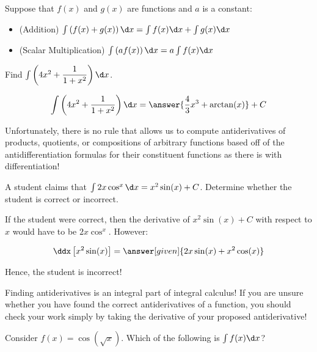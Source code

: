 \documentclass[nooutcomes]{ximera}
\begin{document}
\begin{theorem} 
Suppose that $f(x)$ and $g(x)$ are functions and $a$ is a constant:
\begin{itemize}
\item (Addition) $\int \left(f(x) + g(x) \right) \d x = \int f(x) \d x+\int g(x)  \d x$
\item (Scalar Multiplication) $\int \left(a f(x)\right) \d x = a \int f(x) \d x$
\end{itemize}
\end{theorem}

\begin{question} 
  Find $\int \left(4x^2 + \dfrac{1}{1+x^2} \right)\d x$.
  \begin{prompt} 
    \[
    \int \left(4x^2 + \dfrac{1}{1+x^2} \right) \d x  = \answer{\frac{4}{3} x^3 + \arctan(x)} +C 
    \]
  \end{prompt}
\end{question}



Unfortunately, there is no rule that allows us to compute antiderivatives of products, quotients, or compositions of arbitrary functions based off of the antidifferentiation formulas for their constituent functions as there is with differentiation!  


\begin{example}
  A student claims that $\int 2x \cos^x \d x = x^2 \sin(x) +C$.  Determine whether the student is correct or incorrect.
  
  \begin{explanation}
    If the student were correct, then the derivative of $x^2 \sin(x) +C$ with respect to $x$ would have to be $2x \cos^x$.  However:
    
      \[\ddx \left[ x^2 \sin(x) \right] = \answer[given]{2x \sin(x) +x^2 \cos(x)} \]
      
 Hence, the student is incorrect!
  \end{explanation}
\end{example}

\begin{remark}
Finding antiderivatives is an integral part of integral calculus!  If you are unsure whether you have found the correct antiderivatives of a function, you should check your work simply by taking the derivative of your proposed antiderivative!  
\end{remark}

\begin{question}
  Consider $f(x) = \cos(\sqrt{x})$. Which of the following is $\int f(x) \d x$?  
  \begin{selectAll}
  \end{selectAll}
\end{question}
\end{document}
